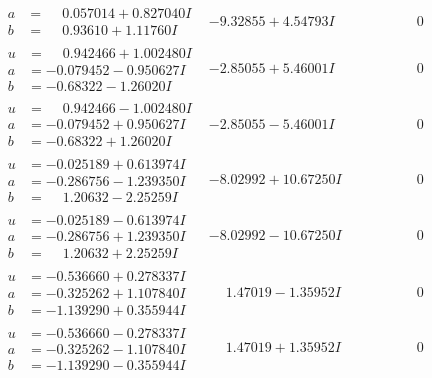 \documentclass[1p]{elsarticle_modified}
\theoremstyle{definition}
\begin{document}
$$\begin{array}{c|c|c}
\begin{aligned}
a &= \phantom{-}0.057014 + 0.827040 I \\
b &= \phantom{-}0.93610 + 1.11760 I\end{aligned}
 & -9.32855 + 4.54793 I & \phantom{-0.000000 } 0 \\ \hline\begin{aligned}
u &= \phantom{-}0.942466 + 1.002480 I \\
a &= -0.079452 - 0.950627 I \\
b &= -0.68322 - 1.26020 I\end{aligned}
 & -2.85055 + 5.46001 I & \phantom{-0.000000 } 0 \\ \hline\begin{aligned}
u &= \phantom{-}0.942466 - 1.002480 I \\
a &= -0.079452 + 0.950627 I \\
b &= -0.68322 + 1.26020 I\end{aligned}
 & -2.85055 - 5.46001 I & \phantom{-0.000000 } 0 \\ \hline\begin{aligned}
u &= -0.025189 + 0.613974 I \\
a &= -0.286756 - 1.239350 I \\
b &= \phantom{-}1.20632 - 2.25259 I\end{aligned}
 & -8.02992 + 10.67250 I & \phantom{-0.000000 } 0 \\ \hline\begin{aligned}
u &= -0.025189 - 0.613974 I \\
a &= -0.286756 + 1.239350 I \\
b &= \phantom{-}1.20632 + 2.25259 I\end{aligned}
 & -8.02992 - 10.67250 I & \phantom{-0.000000 } 0 \\ \hline\begin{aligned}
u &= -0.536660 + 0.278337 I \\
a &= -0.325262 + 1.107840 I \\
b &= -1.139290 + 0.355944 I\end{aligned}
 & \phantom{-}1.47019 - 1.35952 I & \phantom{-0.000000 } 0 \\ \hline\begin{aligned}
u &= -0.536660 - 0.278337 I \\
a &= -0.325262 - 1.107840 I \\
b &= -1.139290 - 0.355944 I\end{aligned}
 & \phantom{-}1.47019 + 1.35952 I & \phantom{-0.000000 } 0 \\ \hline\begin{aligned}

\end{aligned}
\end{array}$$
\end{document}
